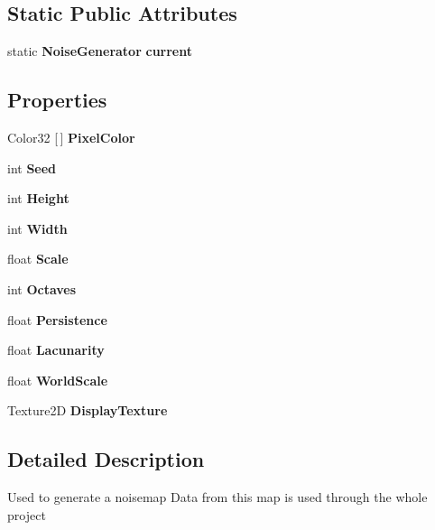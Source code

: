 \subsection*{Static Public Attributes}
\begin{DoxyCompactItemize}
\item 
static \textbf{ Noise\+Generator} \textbf{ current}
\end{DoxyCompactItemize}
\subsection*{Properties}
\begin{DoxyCompactItemize}
\item 
Color32 [$\,$] \textbf{ Pixel\+Color}\hspace{0.3cm}{\ttfamily  [get, set]}
\item 
int \textbf{ Seed}\hspace{0.3cm}{\ttfamily  [get, set]}
\item 
int \textbf{ Height}\hspace{0.3cm}{\ttfamily  [get, set]}
\item 
int \textbf{ Width}\hspace{0.3cm}{\ttfamily  [get, set]}
\item 
float \textbf{ Scale}\hspace{0.3cm}{\ttfamily  [get, set]}
\item 
int \textbf{ Octaves}\hspace{0.3cm}{\ttfamily  [get, set]}
\item 
float \textbf{ Persistence}\hspace{0.3cm}{\ttfamily  [get, set]}
\item 
float \textbf{ Lacunarity}\hspace{0.3cm}{\ttfamily  [get, set]}
\item 
float \textbf{ World\+Scale}\hspace{0.3cm}{\ttfamily  [get, set]}
\item 
Texture2D \textbf{ Display\+Texture}\hspace{0.3cm}{\ttfamily  [get, set]}
\end{DoxyCompactItemize}


\subsection{Detailed Description}
Used to generate a noisemap Data from this map is used through the whole project 



